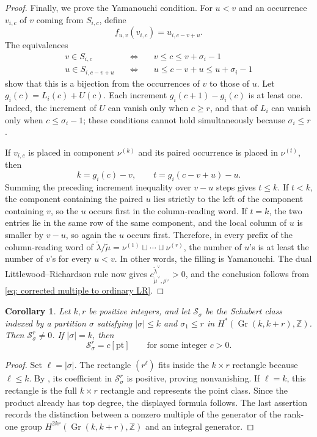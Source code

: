 \documentclass[11pt, reqno]{amsart}
\numberwithin{equation}{section}
\newtheorem{corollary}[theorem]{Corollary}
\theoremstyle{definition}
\DeclareMathOperator{\Gr}{Gr}
\begin{document}
\begin{appendix}
\begin{proof}
Finally, we prove the Yamanouchi condition.  For $u<v$ and an occurrence
$v_{i,c}$ of $v$ coming from $S_{i,c}$, define
\begin{equation}\label{eq: corrected pairing}
f_{u,v}(v_{i,c})=u_{i,c-v+u}.
\end{equation}
The equivalences
\begin{eqnarray*}
v\in S_{i,c} \quad & \Longleftrightarrow & \quad v\leq c\leq v+\sigma_i-1\\
u\in S_{i,c-v+u} \quad & \Longleftrightarrow & \quad u\leq c-v+u\leq u+\sigma_i-1
\end{eqnarray*}
show that this is a bijection from the occurrences of $v$ to those of $u$.
Let $g_i(c)=L_i(c)+U(c)$.  Each increment
$g_i(c+1)-g_i(c)$ is at least one.  Indeed, the increment of $U$ can vanish
only when $c\geq r$, and that of $L_i$ can vanish only when
$c\leq\sigma_i-1$; these conditions cannot hold simultaneously because
$\sigma_i\leq r$.

If $v_{i,c}$ is placed in component $\nu^{(k)}$ and its paired occurrence
is placed in $\nu^{(t)}$, then
\[
k=g_i(c)-v,
\qquad
t=g_i(c-v+u)-u.
\]
Summing the preceding increment inequality over $v-u$ steps gives $t\leq k$.
If $t<k$, the component containing the paired $u$ lies strictly to the left
of the component containing $v$, so the $u$ occurs first in the column-reading
word.  If $t=k$, the two entries lie in the same row of the same component,
and the local column of $u$ is smaller by $v-u$, so again the $u$ occurs
first.  Therefore, in every prefix of the column-reading word of $\widetilde\lambda/\widetilde\mu=\nu^{(1)}\sqcup\cdots \sqcup \nu^{(r)}$, the number of
$u$'s is at least the number of $v$'s for every $u<v$.  In other words, the filling is
Yamanouchi.  The dual Littlewood--Richardson rule now gives
$c_{\widetilde\mu^\vee,\rho^\vee}^{\widetilde\lambda^\vee}>0$, and the conclusion follows
from \eqref{eq: corrected multiple to ordinary LR}.
\end{proof}

\begin{corollary}\label{cor: Schubert corrected}
Let $k,r$ be positive integers, and let $\mathcal S_\sigma$ be the Schubert
class indexed by a partition $\sigma$ satisfying $|\sigma|\leq k$ and
$\sigma_1\leq r$ in $H^*(\Gr(k,k+r),\mathbb Z)$.  Then
$\mathcal S_\sigma^r\neq0$.  If $|\sigma|=k$, then
\[
\mathcal S_\sigma^r=c[\mathrm{pt}]
\qquad\text{for some integer }c>0.
\]
\end{corollary}

\begin{proof}
Set $\ell=|\sigma|$.  The rectangle $(r^\ell)$ fits inside the $k\times r$
rectangle because $\ell\leq k$.  By , its
coefficient in $\mathcal S_\sigma^r$ is positive, proving nonvanishing.  If
$\ell=k$, this rectangle is the full $k\times r$ rectangle and represents the
point class.  Since the product already has top degree, the displayed formula
follows.  The last assertion records the distinction between a nonzero
multiple of the generator of the rank-one group
$H^{2kr}(\Gr(k,k+r),\mathbb Z)$ and an integral generator.
\end{proof}


\end{appendix}
\end{document}
